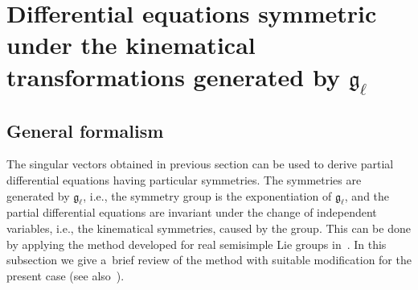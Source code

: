 \documentclass[pdftex]{sigma}
\numberwithin{equation}{section}
\begin{document}
\section[Differential equations symmetric under the kinematical transformations generated by ${\mathfrak g}_{\ell}$]{Dif\/ferential equations symmetric\\ under the kinematical transformations generated by $\boldsymbol{{\mathfrak g}_{\ell}}$}
\label{SED:EQS}

\subsection{General formalism}
\label{GeneSche}

The singular vectors obtained in previous section can be used to derive partial dif\/ferential equations having particular
symmetries.
The symmetries are generated by $ {\mathfrak g}_{\ell}$, i.e., the symmetry group is the exponentiation of $ {\mathfrak
g}_{\ell}$, and the partial dif\/ferential equations are invariant under the change of independent variables, i.e., the
kinematical symmetries, caused by the group.
This can be done by applying the method developed for real semisimple Lie groups in~\cite{Dobrev}.
In this subsection we give a~brief review of the method with suitable modif\/ication for the present case (see
also~\cite{ADD,ADDS, AiKimSeg}).
\end{document}
